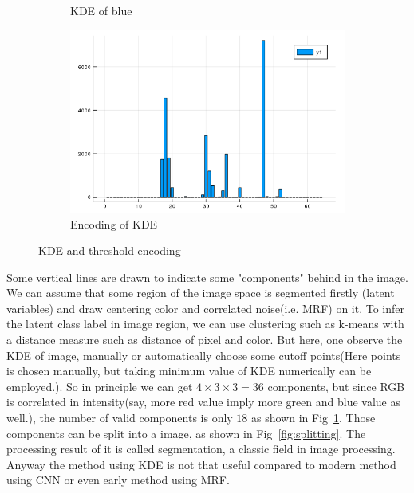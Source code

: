 \documentclass{article}
\begin{document}
\begin{figure}[htb]
\begin{subfigure}[b]{0.24\linewidth}
    \caption{KDE of blue}
  \end{subfigure}
  \begin{subfigure}[b]{0.24\linewidth}
    \includegraphics[width=\linewidth]{images/kde_code.png}
    \caption{Encoding of KDE}
  \end{subfigure}
  \caption{KDE and threshold encoding}
  \label{fig:kde}
\end{figure}

Some vertical lines are drawn to indicate some "components" behind in the image. 
We can assume that some region of the image space is segmented firstly (latent variables) 
and draw centering color and correlated noise(i.e. MRF) on it. 
To infer the latent class label in image region,
we can use clustering such as k-means with a distance measure such as distance of pixel and color. 
But here, one observe the KDE of image,
manually or automatically choose some cutoff points(Here points is chosen manually, 
but taking minimum value of KDE numerically can be employed.). 
So in principle we can get $4\times 3\times 3=36$ components, 
but since RGB is correlated in intensity(say, more red value imply more green and blue value as well.), 
the number of valid components is only $18$ as shown in Fig~\ref{fig:kde}.
Those components can be split into a image, as shown in Fig~\ref{fig:splitting}. 
The processing result of it is called segmentation, a classic field in image processing. 
Anyway the method using KDE is not that useful compared to modern method using CNN \cite{long2015fully} or 
even early method using MRF\cite{panjwani1995markov}. 
\end{document}
